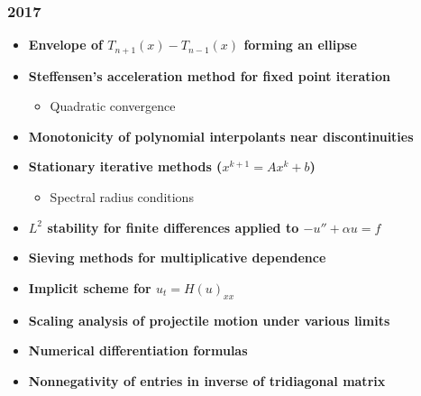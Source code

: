 \subsubsection*{2017}
\begin{itemize}
    \item \textbf{Envelope of $T_{n+1}(x) - T_{n-1}(x)$ forming an ellipse}
    \item \textbf{Steffensen's acceleration method for fixed point iteration}
        \begin{itemize}
            \item Quadratic convergence
        \end{itemize}
    \item \textbf{Monotonicity of polynomial interpolants near discontinuities}
    \item \textbf{Stationary iterative methods ($x^{k+1} = Ax^k + b$)}
        \begin{itemize}
            \item Spectral radius conditions
        \end{itemize}
    \item \textbf{$L^2$ stability for finite differences applied to $-u'' + \alpha u = f$}
    \item \textbf{Sieving methods for multiplicative dependence}
    \item \textbf{Implicit scheme for $u_t = H(u)_{xx}$}
    \item \textbf{Scaling analysis of projectile motion under various limits}
    \item \textbf{Numerical differentiation formulas}
    \item \textbf{Nonnegativity of entries in inverse of tridiagonal matrix}
\end{itemize}

